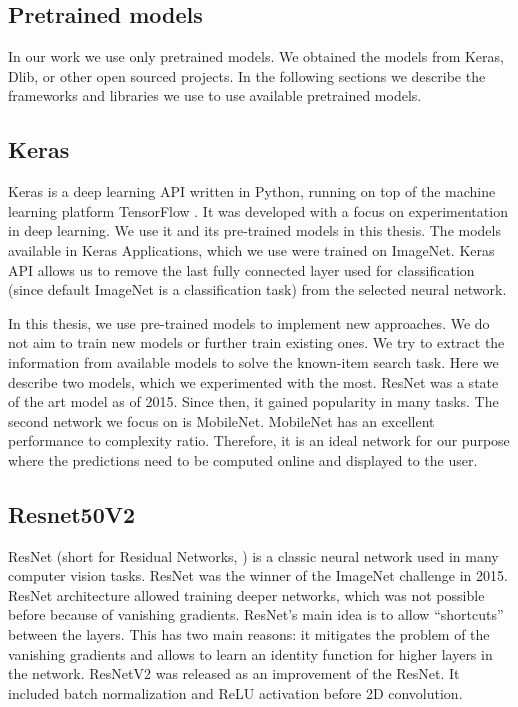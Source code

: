 \subsection{Pretrained models}
\label{ss:pretrained_models}

In our work we use only pretrained models. We obtained the models from Keras, Dlib, or other open sourced projects. In the following sections we describe the frameworks and libraries we use to use available pretrained models.

\subsection{Keras}

Keras \citep{chollet2015keras} is a deep learning API written in Python, running on top of the machine learning platform TensorFlow \citep{tensorflow2015-whitepaper}. It was developed with a focus on experimentation in deep learning. We use it and its pre-trained models in this thesis. The models available in Keras Applications, which we use were trained on ImageNet. Keras API allows us to remove the last fully connected layer used for classification (since default ImageNet is a classification task) from the selected neural network.

In this thesis, we use pre-trained models to implement new approaches. We do not aim to train new models or further train existing ones. We try to extract the information from available models to solve the known-item search task. Here we describe two models, which we experimented with the most. ResNet was a state of the art model as of 2015. Since then, it gained popularity in many tasks. The second network we focus on is MobileNet. MobileNet has an excellent performance to complexity ratio. Therefore, it is an ideal network for our purpose where the predictions need to be computed online and displayed to the user.

\subsection*{Resnet50V2}

ResNet (short for Residual Networks, \cite{resnet}) is a classic neural network used in many computer vision tasks. ResNet was the winner of the ImageNet challenge in 2015. ResNet architecture allowed training deeper networks, which was not possible before because of vanishing gradients. ResNet's main idea is to allow ``shortcuts'' between the layers. This has two main reasons: it mitigates the problem of the vanishing gradients and allows to learn an identity function for higher layers in the network. ResNetV2 \citep{resnetv2} was released as an improvement of the ResNet. It included batch normalization and ReLU activation before 2D convolution. 

